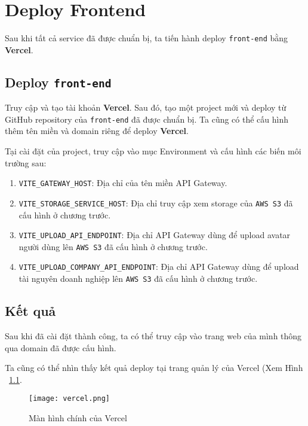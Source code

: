 \chapter{Deploy Frontend}
\label{Chapter5}
Sau khi tất cả service đã được chuẩn bị, ta tiến hành deploy \texttt{front-end} bằng \textbf{Vercel}.

\section{Deploy \texttt{front-end}}
Truy cập và tạo tài khoản \textbf{Vercel}. Sau đó, tạo một project mới và deploy từ GitHub repository của \texttt{front-end} đã được chuẩn bị.
Ta cũng có thể cấu hình thêm tên miền và domain riêng để deploy \textbf{Vercel}.

Tại cài đặt của project, truy cập vào mục Environment và cấu hình các biến môi trường sau:
\begin{enumerate}
    \item \texttt{VITE\_GATEWAY\_HOST}: Địa chỉ của tên miền API Gateway.
    \item \texttt{VITE\_STORAGE\_SERVICE\_HOST}: Địa chỉ truy cập xem storage của \texttt{AWS S3} đã cấu hình ở chương trước.
    \item \texttt{VITE\_UPLOAD\_API\_ENDPOINT}: Địa chỉ API Gateway dùng để upload avatar người dùng lên \texttt{AWS S3} đã cấu hình ở chương trước.
    \item \texttt{VITE\_UPLOAD\_COMPANY\_API\_ENDPOINT}: Địa chỉ API Gateway dùng để upload tài nguyên doanh nghiệp lên \texttt{AWS S3} đã cấu hình ở chương trước.
\end{enumerate}

\section{Kết quả}
Sau khi đã cài đặt thành công, ta có thể truy cập vào trang web của mình thông qua domain đã được cấu hình.

Ta cũng có thể nhìn thấy kết quả deploy tại trang quản lý của Vercel (Xem Hình ~\ref{fig:vercel}.

\begin{figure}
    \centering
    \texttt{[image: vercel.png]}
    \caption{Màn hình chính của Vercel}
    \label{fig:vercel}
\end{figure}

